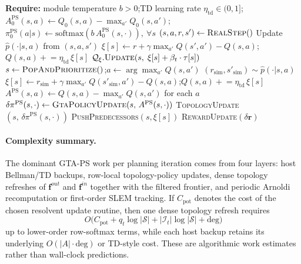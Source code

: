 \documentclass[10pt,a4paper]{article}
\begin{document}
\begin{algorithm}[!h]
\caption{Dyna (one-step TD) + GTA-PS}
\begin{algorithmic}[1]
\Statex \textbf{Require:} module temperature $b>0$;\quad TD learning rate $\eta_{\mathrm{td}}\in(0,1]$;\quad $A^{\mathrm{PS}}_0(s,a) \gets Q_0(s,a) - \max_{a'}Q_0(s,a')$;\quad $\pi^{\mathrm{PS}}_0(a|s) \gets \mathrm{softmax}(b\,A^{\mathrm{PS}}_0(s,\cdot)),\ \forall s$
  \State $(s,a,r,s') \gets \textsc{RealStep}()$ 
  \State Update $\hat{p}(\cdot|s,a)$ from $(s,a,s')$ 
  \State $\xi[s] \gets r + \gamma \max_{a'} Q(s',a') - Q(s,a)$;\quad $Q(s,a) \mathrel{+}= \eta_{\mathrm{td}}\,\xi[s]$
  \State $\mathcal{Q}_{\xi}.\textsc{Update}(s,\; \xi[s]+\beta_t\cdot\tau[s])$ 
   
    \State $s \gets \textsc{PopAndPrioritize}()$;\quad $a \gets \arg\max_{a'} Q(s,a')$
    \State $(r_{\mathrm{sim}}, s'_{\mathrm{sim}}) \sim \hat{p}(\cdot|s,a)$
    \State $\xi[s] \gets r_{\mathrm{sim}} + \gamma\max_{a'}Q(s'_{\mathrm{sim}},a') - Q(s,a)$;\quad $Q(s,a) \mathrel{+}= \eta_{\mathrm{td}}\,\xi[s]$
    \State $A^{\mathrm{PS}}(s,a) \gets Q(s,a) - \max_{a'}Q(s,a')$ for each $a$
    \State $\delta\pi^{\mathrm{PS}}(s,\cdot) \gets \textsc{GtaPolicyUpdate}(s,\,A^{\mathrm{PS}}(s,\cdot))$ 
    \State \textsc{TopologyUpdate}$(s,\,\delta\pi^{\mathrm{PS}}(s,\cdot))$ 
    \State \textsc{PushPredecessors}$(s, \xi[s])$
  \EndFor
   \textsc{RewardUpdate}$(\delta\mathbf{r})$ \EndIf
\EndWhile
\end{algorithmic}
\end{algorithm}


\paragraph{Complexity summary.}
The dominant GTA-PS work per planning iteration comes from four layers: host Bellman/TD backups, row-local topology-policy updates, dense topology refreshes of $\mathbf{f}^{out}$ and $\mathbf{f}^{in}$ together with the filtered frontier, and periodic Arnoldi recomputation or first-order SLEM tracking.  If $C_{\mathrm{pot}}$ denotes the cost of the chosen resolvent update routine, then one dense topology refresh requires
\[
  O\!\bigl(C_{\mathrm{pot}} + q_t\log|\mathcal{S}| + |\mathcal{I}_t|\log|\mathcal{S}| + \mathrm{deg}\bigr)
\]
up to lower-order row-softmax terms, while each host backup retains its underlying $O(|A|\cdot\mathrm{deg})$ or TD-style cost.  These are algorithmic work estimates rather than wall-clock predictions.
\end{document}
